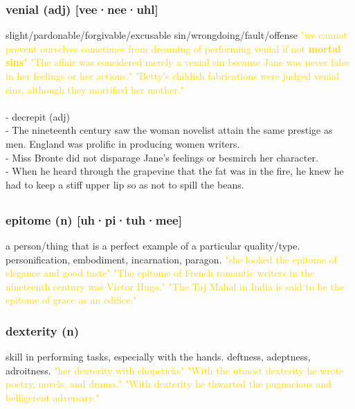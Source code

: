 \documentclass{proc}
\begin{document}
	\subsubsection{\textcolor{brickred}{venial} (adj) [vee·nee·uhl]}
	slight/pardonable/forgivable/excusable sin/wrongdoing/fault/offense
	\textcolor{gold}{"we cannot prevent ourselves sometimes from dreaming of performing venial if not \textbf{mortal sins}" "The affair was 
		considered merely a venial sin because Jane was never false 
		in her feelings or her actions." "Betty's childish fabrications were judged venial sins, although they 
		mortified her mother."}\\\\
	- decrepit (adj)\\
	- The nineteenth century saw the woman novelist attain the 
	same prestige as men. England was prolific in producing 
	women writers.\\
	- Miss Bronte did not 
	disparage Jane's feelings or besmirch her character.\\
	- When he heard through the grapevine that the fat was in the fire, 
	he knew he had to keep a stiff upper lip so as not to spill the beans.
	
	\newpage
	\subsection{}
	\subsubsection{\textcolor{brickred}{epitome} (n) [uh·pi·tuh·mee]}
	a person/thing that is a perfect example of a particular quality/type. 
	personification,
	embodiment,
	incarnation,
	paragon.
	\textcolor{gold}{"she looked the epitome of elegance and good taste" "The epitome of French romantic writers in the nineteenth 
		century was Victor Hugo." "The Taj Mahal in India is said to be the epitome of grace as an edifice."}
	
	\subsubsection{\textcolor{brickred}{dexterity} (n)}
	skill in performing tasks, especially with the hands. 
	deftness,
	adeptness,
	adroitness.
	\textcolor{gold}{"her dexterity with chopsticks" "With the utmost dexterity he wrote 
		poetry, novels, and drama." "With dexterity he thwarted the pugnacious and belligerent adversary."}
	
\end{document}

